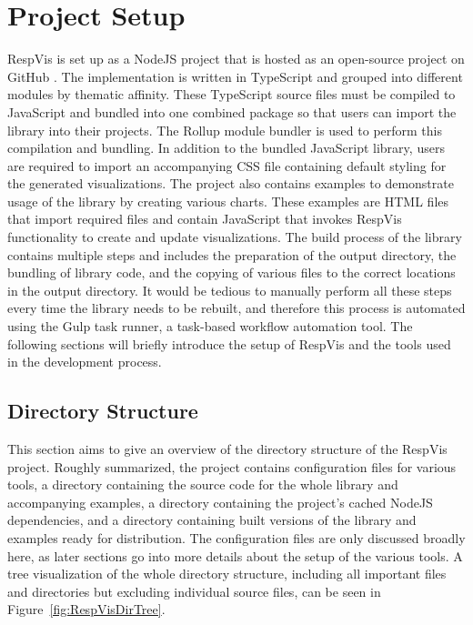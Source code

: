 \section{Project Setup}
\label{sec:ProjectSetup}

RespVis is set up as a NodeJS \parencite{NodeJS} project that is
hosted as an open-source project on GitHub \parencite{RespVisGitHub}.
The implementation is written in TypeScript and grouped into different
modules by thematic affinity.  These TypeScript source files must be
compiled to JavaScript and bundled into one combined package so that
users can import the library into their projects.  The Rollup module
bundler \parencite{Rollup} is used to perform this compilation and
bundling.  In addition to the bundled JavaScript library, users are
required to import an accompanying CSS file containing default styling
for the generated visualizations.  The project also contains examples
to demonstrate usage of the library by creating various charts.  These
examples are HTML files that import required files and contain
JavaScript that invokes RespVis functionality to create and update
visualizations.  The build process of the library contains multiple
steps and includes the preparation of the output directory, the
bundling of library code, and the copying of various files to the
correct locations in the output directory.  It would be tedious to
manually perform all these steps every time the library needs to be
rebuilt, and therefore this process is automated using the Gulp
\parencite{Gulp} task runner, a task-based workflow automation tool.
The following sections will briefly introduce the setup of RespVis and
the tools used in the development process.

\subsection{Directory Structure}

This section aims to give an overview of the directory structure of
the RespVis project.  Roughly summarized, the project contains
configuration files for various tools, a  directory
containing the source code for the whole library and accompanying
examples, a  directory containing the project's
cached NodeJS dependencies, and a  directory containing
built versions of the library and examples ready for distribution.
The configuration files are only discussed broadly here, as later
sections go into more details about the setup of the various tools.  A
tree visualization of the whole directory structure, including all
important files and directories but excluding individual source files,
can be seen in Figure~\ref{fig:RespVisDirTree}.

